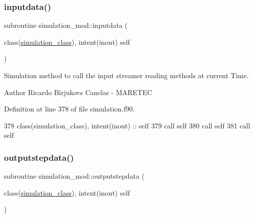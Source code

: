 \subsubsection{\texorpdfstring{inputdata()}{inputdata()}}
{\footnotesize\ttfamily subroutine simulation\+\_\+mod\+::inputdata (\begin{DoxyParamCaption}\item[{class(\mbox{\hyperlink{structsimulation__mod_1_1simulation__class}{simulation\+\_\+class}}), intent(inout)}]{self }\end{DoxyParamCaption})\hspace{0.3cm}{\ttfamily [private]}}



Simulation method to call the input streamer reading methods at current Time. 

\begin{DoxyAuthor}{Author}
Ricardo Birjukovs Canelas -\/ M\+A\+R\+E\+T\+EC 
\end{DoxyAuthor}


Definition at line 378 of file simulation.\+f90.


\begin{DoxyCode}
378     \textcolor{keywordtype}{class}(simulation\_class), \textcolor{keywordtype}{intent(inout)} :: self
379     \textcolor{keyword}{call }self%
380     \textcolor{keyword}{call }self%
381     \textcolor{keyword}{call }self%
\end{DoxyCode}
\mbox{\label{namespacesimulation__mod_a5735e9ecb39f15061f3d766b0de7809d}} 
\subsubsection{\texorpdfstring{outputstepdata()}{outputstepdata()}}
{\footnotesize\ttfamily subroutine simulation\+\_\+mod\+::outputstepdata (\begin{DoxyParamCaption}\item[{class(\mbox{\hyperlink{structsimulation__mod_1_1simulation__class}{simulation\+\_\+class}}), intent(inout)}]{self }\end{DoxyParamCaption})\hspace{0.3cm}{\ttfamily [private]}}



